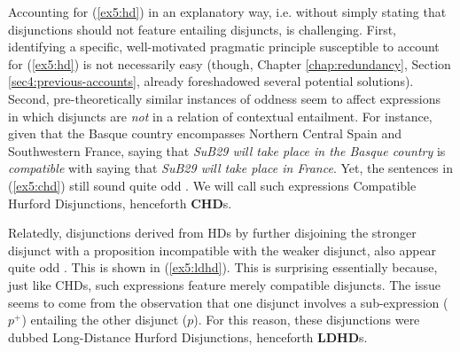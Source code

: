 \begin{exe}
	\ex \label{ex5:hd}
	\begin{xlist}
		\label{ex5:hd-sw}
		\label{ex5:hd-ws}
	\end{xlist}
\end{exe}

Accounting for (\ref{ex5:hd}) in an explanatory way, i.e. without simply stating that disjunctions should not feature entailing disjuncts, is challenging. First, identifying a specific, well-motivated pragmatic principle susceptible to account for (\ref{ex5:hd}) is not necessarily easy (though, Chapter \ref{chap:redundancy}, Section \ref{sec4:previous-accounts}, already foreshadowed several potential solutions). Second, pre-theoretically similar instances of oddness seem to affect expressions in which disjuncts are \textit{not} in a relation of contextual entailment. For instance, given that the Basque country encompasses Northern Central Spain and Southwestern France, saying that \textit{SuB29 will take place in the Basque country} is \textit{compatible} with saying that \textit{SuB29 will take place in France}. Yet, the sentences in (\ref{ex5:chd}) still sound quite odd \citep{Singh2008a}. We will call such expressions Compatible Hurford Disjunctions, henceforth \textbf{CHD}s.
\begin{exe}
	\ex \label{ex5:chd}
	\begin{xlist}
		\label{ex5:chd-1}
		\label{ex5:chd-2}
	\end{xlist}
\end{exe} 

Relatedly, disjunctions derived from HDs by further disjoining the stronger disjunct with a proposition incompatible with the weaker disjunct, also appear quite odd \citep{Marty2022}. This is shown in (\ref{ex5:ldhd}). This is surprising essentially because, just like CHDs, such expressions feature merely compatible disjuncts. The issue seems to come from the observation that one disjunct involves a sub-expression ($p^+$) entailing the other disjunct ($p$). For this reason, these disjunctions were dubbed Long-Distance Hurford Disjunctions, henceforth \textbf{LDHD}s.

